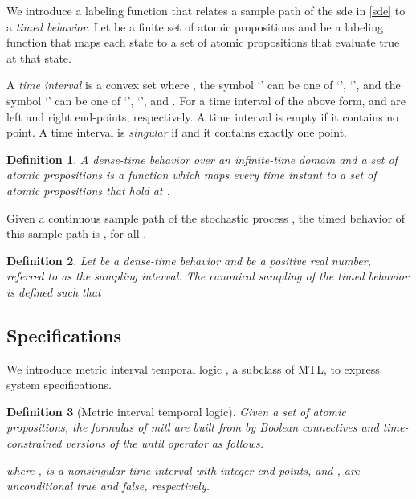 \documentclass[letterpaper, 10 pt, conference]{ieeeconf}
\newtheorem{definition}{Definition}
\begin{document}
We introduce a labeling function that relates a sample path of the
\ac{sde} in \eqref{sde} to a \emph{timed behavior}. Let  be
a finite set of atomic propositions and 
be a labeling function that maps each state  to a set of
atomic propositions that evaluate true at that state.


A \emph{time interval}  is a convex set 
where , the symbol `' can be one of
`', `', and the symbol `' can be one of `',
`', and . For a time interval of the above form,  and
 are left and right end-points, respectively.  A time interval is
empty if it contains no point. A time interval is \emph{singular} if
 and it contains exactly one point.
\begin{definition} \cite{Furia2006}
  A \emph{dense-time behavior} over an infinite-time domain
   and a set  of atomic propositions is a
  function  which maps every
  time instant  to a set  of atomic
  propositions that hold at .
\end{definition}
Given a continuous sample path  of
the stochastic process , the timed behavior  of this
sample path is , for all .



\begin{definition}
  \cite{Furia2006} Let  be a dense-time behavior and
   be a positive real number, referred to
  as the \emph{sampling interval}. The \emph{canonical sampling}
   of the timed behavior  is
  defined such that 
\end{definition}







\subsection{Specifications}


We introduce metric interval temporal logic \cite{Alur1996}, a
subclass of MTL, to express system specifications.
\begin{definition}[Metric interval temporal logic]
Given a set  of atomic propositions, the formulas of \ac{mitl}
are built from  by Boolean connectives and time-constrained
versions of the \emph{until} operator  as follows.

where ,  is a \emph{nonsingular} time interval with
integer end-points, and ,  are unconditional true and
false, respectively.
\end{definition}
\end{document}
